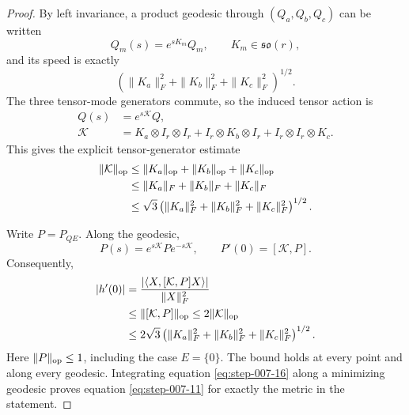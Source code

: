 \begin{proof}
By left invariance, a product geodesic through
\((Q_a,Q_b,Q_c)\) can be written
\[
  Q_m(s)=e^{sK_m}Q_m,
  \qquad K_m\in\mathfrak{so}(r),
\]
and its speed is exactly
\begin{equation}
  \left(\|K_a\|_F^2+\|K_b\|_F^2+\|K_c\|_F^2\right)^{1/2}.  \label{eq:step-007-12}
\end{equation}
The three tensor-mode generators commute, so the induced tensor action is
\begin{equation}
\begin{aligned}
  Q(s)&=e^{s\mathcal K}Q,\\
  \mathcal K
  &=K_a\otimes I_r\otimes I_r
    +I_r\otimes K_b\otimes I_r
    +I_r\otimes I_r\otimes K_c.
\end{aligned}\label{eq:step-007-13}
\end{equation}
This gives the explicit tensor-generator estimate
\begin{equation}
\begin{aligned}
  \|\mathcal K\|_{\rm op}
  &\le \|K_a\|_{\rm op}+\|K_b\|_{\rm op}+\|K_c\|_{\rm op}\\
  &\le \|K_a\|_F+\|K_b\|_F+\|K_c\|_F\\
  &\le \sqrt3
  \left(\|K_a\|_F^2+\|K_b\|_F^2+\|K_c\|_F^2\right)^{1/2}.
\end{aligned}\label{eq:step-007-14}
\end{equation}

Write \(P=P_{QE}\). Along the geodesic,
\begin{equation}
  P(s)=e^{s\mathcal K}Pe^{-s\mathcal K},
  \qquad P'(0)=[\mathcal K,P].                               \label{eq:step-007-15}
\end{equation}
Consequently,
\begin{equation}
\begin{aligned}
  |h'(0)|
  &=\frac{|\langle X,[\mathcal K,P]X\rangle|}{\|X\|_F^2}\\
  &\le\|[\mathcal K,P]\|_{\rm op}
  \le2\|\mathcal K\|_{\rm op}\\
  &\le2\sqrt3
  \left(\|K_a\|_F^2+\|K_b\|_F^2+\|K_c\|_F^2\right)^{1/2}.
\end{aligned}\label{eq:step-007-16}
\end{equation}
Here \(\|P\|_{\rm op}\le1\), including the case \(E=\{0\}\). The bound
holds at every point and along every geodesic. Integrating equation \eqref{eq:step-007-16}
along a minimizing geodesic proves equation \eqref{eq:step-007-11} for exactly the metric in
the statement. 

\end{proof}


